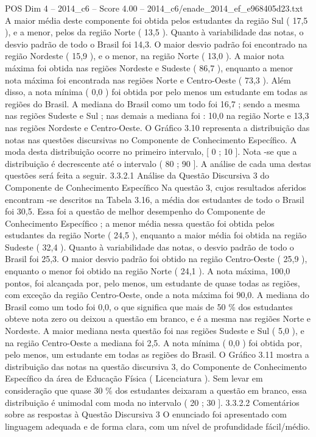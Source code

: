 \begin{textsample}{POS Dim 4 – 2014\_c6 – Score 4.00 – 2014\_c6/enade\_2014\_ef\_e968405d23.txt}
A maior média deste componente foi obtida pelos estudantes da região Sul ( 17,5 ), e a menor, pelos da região Norte ( 13,5 ).
Quanto à variabilidade das notas, o desvio padrão de todo o Brasil foi 14,3.
O maior desvio padrão foi encontrado na região Nordeste ( 15,9 ), e o menor, na região Norte ( 13,0 ).
A maior nota máxima foi obtida nas regiões Nordeste e Sudeste ( 86,7 ), enquanto a menor nota máxima foi encontrada nas regiões Norte e Centro-Oeste ( 73,3 ).
Além disso, a nota mínima ( 0,0 ) foi obtida por pelo menos um estudante em todas as regiões do Brasil.
A mediana do Brasil como um todo foi 16,7 ; sendo a mesma nas regiões Sudeste e Sul ; nas demais a mediana foi : 10,0 na região Norte e 13,3 nas regiões Nordeste e Centro-Oeste.
O Gráfico 3.10 representa a distribuição das notas nas questões discursivas no Componente de Conhecimento Específico.
A moda desta distribuição ocorre no primeiro intervalo, [ 0 ; 10 ].
Nota -se que a distribuição é decrescente até o intervalo ( 80 ; 90 ].
A análise de cada uma destas questões será feita a seguir. 3.3.2.1 Análise da Questão Discursiva 3 do Componente de Conhecimento Específico Na questão 3, cujos resultados aferidos encontram -se descritos na Tabela 3.16, a média dos estudantes de todo o Brasil foi 30,5.
Essa foi a questão de melhor desempenho do Componente de Conhecimento Específico ; a menor média nessa questão foi obtida pelos estudantes da região Norte ( 24,5 ), enquanto a maior média foi obtida na região Sudeste ( 32,4 ).
Quanto à variabilidade das notas, o desvio padrão de todo o Brasil foi 25,3.
O maior desvio padrão foi obtido na região Centro-Oeste ( 25,9 ), enquanto o menor foi obtido na região Norte ( 24,1 ).
A nota máxima, 100,0 pontos, foi alcançada por, pelo menos, um estudante de quase todas as regiões, com exceção da região Centro-Oeste, onde a nota máxima foi 90,0.
A mediana do Brasil como um todo foi 0,0, o que significa que mais de 50 \% dos estudantes obteve nota zero ou deixou a questão em branco, e é a mesma nas regiões Norte e Nordeste.
A maior mediana nesta questão foi nas regiões Sudeste e Sul ( 5,0 ), e na região Centro-Oeste a mediana foi 2,5.
A nota mínima ( 0,0 ) foi obtida por, pelo menos, um estudante em todas as regiões do Brasil.
O Gráfico 3.11 mostra a distribuição das notas na questão discursiva 3, do Componente de Conhecimento Específico da área de Educação Física ( Licenciatura ).
Sem levar em consideração que quase 30 \% dos estudantes deixaram a questão em branco, essa distribuição é unimodal com moda no intervalo ( 20 ; 30 ]. 3.3.2.2 Comentários sobre as respostas à Questão Discursiva 3 O enunciado foi apresentado com linguagem adequada e de forma clara, com um nível de profundidade fácil/médio.

\end{textsample}
